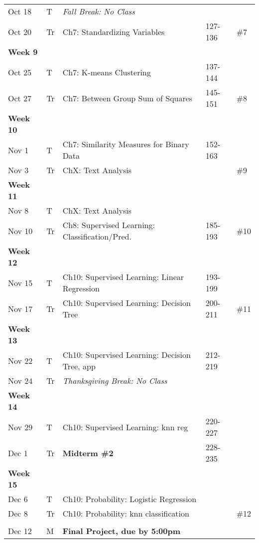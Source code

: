 \documentclass[11pt,letter]{article}
\begin{document}
\begin{small}
{\begin{tabular}{ L{2.2cm}L{1.4cm}L{7.6cm}L{3.5cm}C{3.1cm}}
Oct 18 &   T    &  \textit{Fall Break: No Class}  &    &      \\
Oct 20   &  Tr   &  Ch7: Standardizing Variables  &  127-136  &     \#7 \\
\textbf{Week 9}   \\
Oct 25 &   T   &  Ch7: K-means Clustering  &   137-144 &    \\
Oct 27   &   Tr    &  Ch7: Between Group Sum of Squares   & 145-151  &   \#8    \\
\textbf{Week 10}   \\
Nov 1 &   T    &  Ch7: Similarity Measures for Binary Data  &   152-163 &    \\
Nov 3   &   Tr    &  ChX: Text Analysis &  &  \#9 \\
\textbf{Week 11}   \\
Nov 8 &   T    & ChX: Text Analysis &   &    \\
Nov 10   &   Tr    &  Ch8: Supervised Learning: Classification/Pred. &   185-193 &   \#10 \\
\textbf{Week 12}   \\
Nov 15 &   T    & Ch10: Supervised Learning: Linear Regression &   193-199 &     \\
Nov 17   &   Tr    &  Ch10: Supervised Learning: Decision Tree &   200-211 &  \#11   \\
\textbf{Week 13}   \\
Nov 22 &   T    &  Ch10: Supervised Learning: Decision Tree, app &   212-219 &    \\
Nov 24   &   Tr    & \textit{Thanksgiving Break: No Class} &    &       \\
\textbf{Week 14}   \\
Nov 29 &   T    &  Ch10: Supervised Learning: knn reg &  220-227  & \\
Dec 1   &   Tr    &  \textbf{Midterm \#2}  &  228-235  &      \\
\textbf{Week 15}   \\
Dec 6 &   T    & Ch10: Probability: Logistic Regression &    &    \\
Dec 8   &   Tr    & Ch10: Probability: knn classification &   & \#12   \\
& \\
Dec 12    &   M    &  \textbf{Final Project, due by 5:00pm}  & &  \\


\bottomrule
\end{tabular}}


\end{small}
\fi
\end{document}
